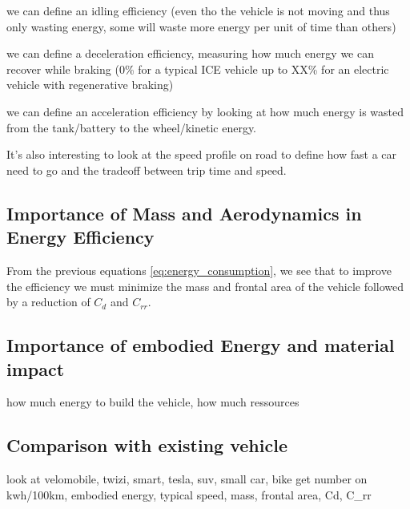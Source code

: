 we can define an idling efficiency (even tho the vehicle is not moving and thus only wasting energy, some will waste more energy per unit of time than others)

we can define a deceleration efficiency, measuring how much energy we can recover while braking (0\% for a typical ICE vehicle up to XX\% for an electric vehicle with regenerative braking) 

we can define an acceleration efficiency by looking at how much energy is wasted from the tank/battery to the wheel/kinetic energy.

It's also interesting to look at the speed profile on road to define how fast a car need to go and the tradeoff between trip time and speed.


\subsection{Importance of Mass and Aerodynamics in Energy Efficiency}

From the previous equations \eqref{eq:energy_consumption}, we see that to improve the efficiency we must minimize the mass and frontal area of the vehicle followed by a reduction of $C_d$ and $C_{rr}$.

\subsection{Importance of embodied Energy and material impact}
how much energy to build the vehicle, how much ressources

\subsection{Comparison with existing vehicle}

look at velomobile, twizi, smart, tesla, suv, small car, bike
get number on kwh/100km, embodied energy, typical speed, mass, frontal area, Cd, C_rr

